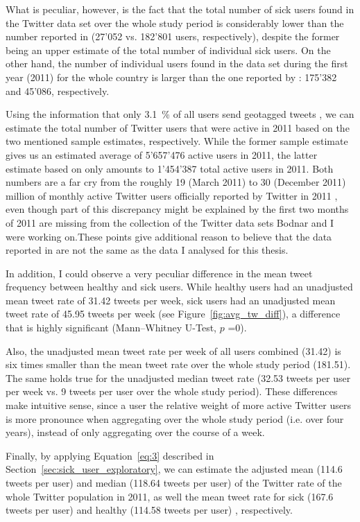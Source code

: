 \documentclass[11pt, a4paper,twoside]{report}\usepackage[]{graphicx}\usepackage[]{color}
\begin{document}
What is peculiar, however, is the fact that the total number of sick users found in the Twitter data set over the whole study period is considerably lower than the number reported in \cite{bodnar_data_2015} (27'052 vs. 182'801 users, respectively), despite the former being an upper estimate of the total number of individual sick users. On the other hand, the number of individual users found in the data set during the first year (2011) for the whole country is larger than the one reported by \cite{bodnar_data_2015}: 175'382 and 45'086, respectively.

Using the information that only 3.1~\% of all users send geotagged tweets \citep{sloan2013knowing}, we can estimate the total number of Twitter users that were active in 2011 based on the two mentioned sample estimates, respectively. While the former sample estimate gives us an estimated average of 5'657'476 active users in 2011, the latter estimate based on \cite{bodnar_data_2015} only amounts to 1'454'387 total active users in 2011. Both numbers are a far cry from the roughly 19 (March 2011) to 30 (December 2011) million of monthly active Twitter users officially reported by Twitter in 2011 \citep{twitter_annual_2013}, even though part of this discrepancy might be explained by the first two months of 2011 are missing from the collection of the Twitter data sets Bodnar and I were working on.These points give additional reason to believe that the data reported in \cite{bodnar_data_2015} are not the same as the data I analysed for this thesis.

In addition, I could observe a very peculiar difference in the mean tweet frequency between healthy and sick users. While healthy users had an unadjusted mean tweet rate of 31.42 tweets per week, sick users had an unadjusted mean tweet rate of 45.95 tweets per week (see Figure~\ref{fig:avg_tw_diff}), a difference that is highly significant (Mann--Whitney U-Test, $p$ =0). 

Also, the unadjusted mean tweet rate per week of all users combined (31.42) is six times smaller than the mean tweet rate over the whole study period (181.51). The same holds true for the unadjusted median tweet rate (32.53 tweets per user per week vs. 9 tweets per user over the whole study period). These differences make intuitive sense, since a user the relative weight of more active Twitter users is more pronounce when aggregating over the whole study period (i.e. over four years), instead of only aggregating over the course of a week.

Finally, by applying Equation~\ref{eq:3} described in Section~\ref{sec:sick_user_exploratory}, we can estimate the adjusted mean (114.6 tweets per user) and median (118.64 tweets per user) of the Twitter rate of the whole Twitter population in 2011, as well the mean tweet rate for sick (167.6 tweets per user) and healthy (114.58 tweets per user) , respectively.\clearpage
\end{document}

